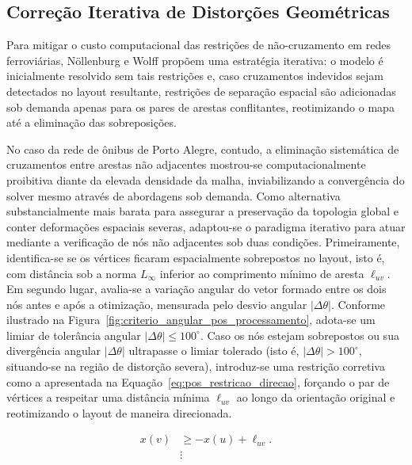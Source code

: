 \documentclass[cic,tc]{infufrgs}
\begin{document}
\subsection{Correção Iterativa de Distorções Geométricas}
\label{subsec:correcao_distorcoes}

Para mitigar o custo computacional das restrições de não-cruzamento em redes ferroviárias, Nöllenburg e Wolff \cite{Nollenburg} propõem uma estratégia iterativa: o modelo é inicialmente resolvido sem tais restrições e, caso cruzamentos indevidos sejam detectados no layout resultante, restrições de separação espacial são adicionadas sob demanda apenas para os pares de arestas conflitantes, reotimizando o mapa até a eliminação das sobreposições.

No caso da rede de ônibus de Porto Alegre, contudo, a eliminação sistemática de cruzamentos entre arestas não adjacentes mostrou-se computacionalmente proibitiva diante da elevada densidade da malha, inviabilizando a convergência do solver mesmo através de abordagens sob demanda. Como alternativa substancialmente mais barata para assegurar a preservação da topologia global e conter deformações espaciais severas, adaptou-se o paradigma iterativo para atuar mediante a verificação de nós não adjacentes sob duas condições. Primeiramente, identifica-se se os vértices ficaram espacialmente sobrepostos no layout, isto é, com distância sob a norma $L_\infty$ inferior ao comprimento mínimo de aresta $\ell_{uv}$. Em segundo lugar, avalia-se a variação angular do vetor formado entre os dois nós antes e após a otimização, mensurada pelo desvio angular $|\Delta\theta|$. Conforme ilustrado na Figura~\ref{fig:criterio_angular_pos_processamento}, adota-se um limiar de tolerância angular $|\Delta\theta| \le 100^\circ$. Caso os nós estejam sobrepostos ou sua divergência angular $|\Delta\theta|$ ultrapasse o limiar tolerado (isto é, $|\Delta\theta| > 100^\circ$, situando-se na região de distorção severa), introduz-se uma restrição corretiva como a apresentada na Equação~\ref{eq:pos_restricao_direcao}, forçando o par de vértices a respeitar uma distância mínima $\ell_{uv}$ ao longo da orientação original e reotimizando o layout de maneira direcionada.

\begin{align}
x(v) &\ge - x(u) + \ell_{uv}. \label{eq:pos_restricao_direcao} \\
&\vdots \nonumber
\end{align}
\end{document}
